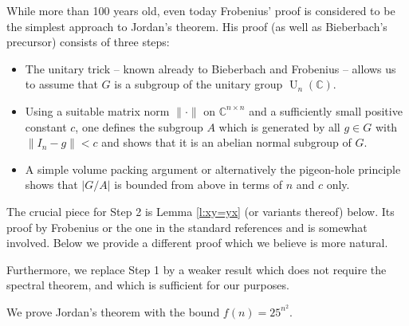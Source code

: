 \documentclass[12pt]{amsart}
\theoremstyle{plain}
\theoremstyle{definition}
\numberwithin{equation}{section}
\newcommand*{\abs}[1]{\lvert#1\rvert}
\newcommand*{\norm}[1]{\lVert#1\rVert}
\newcommand*{\CC}{\mathbb C}
\begin{document}
While more than 100 years old, even today Frobenius' proof is
considered to be the simplest approach to Jordan's theorem. His proof
(as well as Bieberbach's precursor) consists of three steps:
\begin{itemize}
\item[Step 1:] The unitary trick -- known already to Bieberbach and
  Frobenius -- allows us to assume that $G$ is a subgroup of the
  unitary group $\operatorname{U}_n(\CC)$.
\item[Step 2:] Using a suitable matrix norm $\norm{\cdot}$ on
  $\CC^{n\times n}$ and a sufficiently small positive constant $c$,
  one defines the subgroup $A$ which is generated by all $g\in G$ with
  $\norm{I_n-g}<c$ and shows that it is an abelian normal subgroup of
  $G$.
\item[Step 3:] A simple volume packing argument or alternatively the
  pigeon-hole principle shows that $\abs{G/A}$ is bounded from above
  in terms of $n$ and $c$ only.
\end{itemize}
The crucial piece for Step 2 is Lemma \ref{l:xy=yx} (or variants
thereof) below. Its proof by Frobenius or the one in the standard
references \cite[Proof of Th.\ 5.7, part (a)]{Dixon:LinearGroups} and
\cite[(36.17) Lemma]{CurtisReiner:Rep} is somewhat involved. Below we
provide a different proof which we believe is more natural.

Furthermore, we replace Step 1 by a weaker result which does not
require the spectral theorem, and which is sufficient for our
purposes.

We prove Jordan's theorem with the bound $f(n)=25^{n^2}$.
\end{document}
